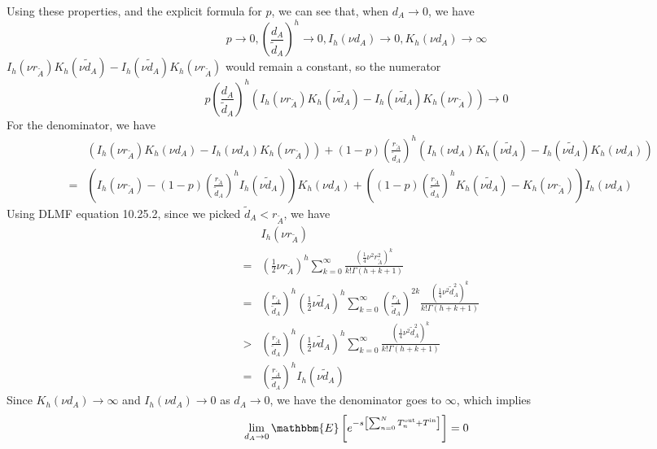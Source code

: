 \documentclass[english, aip, jcp, priprint, graphicx]{revtex4-1}
\newcommand{\tmop}[1]{\ensuremath{\operatorname{#1}}}
\theoremstyle{plain}
\theoremstyle{definition}
\theoremstyle{plain}
\begin{document}
Using these properties, and the explicit formula for $p$, we can see that,
when $d_A \rightarrow 0$, we have
\[ p \rightarrow 0, \left( \frac{d_A}{\tilde{d}_A} \right)^h \rightarrow 0,
I_h (\nu d_A) \rightarrow 0, K_h (\nu d_A) \rightarrow \infty \]
$I_h (\nu r_{\tilde{A}}) K_h (\nu \tilde{d}_A) - I_h (\nu \tilde{d}_A) K_h
(\nu r_{\tilde{A}})$ would remain a constant, so the numerator
\[ p \left( \frac{d_A}{\tilde{d}_A} \right)^h (I_h (\nu r_{\tilde{A}}) K_h
(\nu \tilde{d}_A) - I_h (\nu \tilde{d}_A) K_h (\nu r_{\tilde{A}}))
\rightarrow 0 \]
For the denominator, we have
\begin{eqnarray*}
&  & (I_h (\nu r_{\tilde{A}}) K_h (\nu d_A) - I_h (\nu d_A) K_h (\nu
r_{\tilde{A}})) + (1 - p) \left( \frac{r_{\tilde{A}}}{\tilde{d}_A} \right)^h
(I_h (\nu d_A) K_h (\nu \tilde{d}_A) - I_h (\nu \tilde{d}_A) K_h (\nu
d_A))\\
& = & \left( I_h (\nu r_{\tilde{A}}) - (1 - p) \left(
\frac{r_{\tilde{A}}}{\tilde{d}_A} \right)^h I_h (\nu \tilde{d}_A) \right)
K_h (\nu d_A) + \left( (1 - p) \left( \frac{r_{\tilde{A}}}{\tilde{d}_A}
\right)^h K_h (\nu \tilde{d}_A) - K_h (\nu r_{\tilde{A}}) \right) I_h (\nu
d_A)
\end{eqnarray*}
Using DLMF\cite{noauthor_undated-ti} equation 10.25.2, since we picked $\tilde{d}_A < r_{\tilde{A}}$, we
have
\begin{eqnarray*}
&  & I_h (\nu r_{\tilde{A}})\\
& = & \left( \frac{1}{2} \nu r_{\tilde{A}} \right)^h \sum_{k = 0}^{\infty}
\frac{\left( \frac{1}{4} \nu^2 r_{\tilde{A}}^2 \right)^k}{k! \Gamma (h + k +
1)}\\
& = & \left( \frac{r_{\tilde{A}}}{\tilde{d}_A} \right)^h \left( \frac{1}{2}
\nu \tilde{d}_A \right)^h \sum_{k = 0}^{\infty} \left(
\frac{r_{\tilde{A}}}{\tilde{d}_A} \right)^{2 k} \frac{\left( \frac{1}{4}
\nu^2 \tilde{d}_A^2 \right)^k}{k! \Gamma (h + k + 1)}\\
& > & \left( \frac{r_{\tilde{A}}}{\tilde{d}_A} \right)^h \left( \frac{1}{2}
\nu \tilde{d}_A \right)^h \sum_{k = 0}^{\infty} \frac{\left( \frac{1}{4}
\nu^2 \tilde{d}_A^2 \right)^k}{k! \Gamma (h + k + 1)}\\
& = & \left( \frac{r_{\tilde{A}}}{\tilde{d}_A} \right)^h I_h (\nu
\tilde{d}_A)
\end{eqnarray*}
Since $K_h (\nu d_A) \rightarrow \infty$ and $I_h (\nu d_A) \rightarrow 0$ as
$d_A \rightarrow 0$, we have the denominator goes to $\infty$, which implies
\[ \lim_{d_A \rightarrow 0} \mathbbm{E} \left[ e^{- s \left[ \sum_{n = 0}^N
T_n^{\tmop{out}} + T^{\tmop{in}} \right]} \right] = 0 \]
\end{document}
